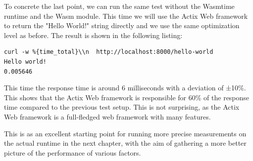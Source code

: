 To concrete the last point, we can run the same test without the Wasmtime runtime and the Wasm module. This time we will use the Actix Web framework to return the "Hello World!" string directly and we use the same optimization level as before. The result is shown in the following listing:

\begin{lstlisting}[frame=lines]
curl -w %{time_total}\\n  http://localhost:8000/hello-world
Hello world!
0.005646
\end{lstlisting}

This time the response time is around 6 milliseconds with a deviation of ±10\%. This shows that the Actix Web framework is responsible for 60\% of the response time compared to the previous test setup. This is not surprising, as the Actix Web framework is a full-fledged web framework with many features. 

This is as an excellent starting point for running more precise measurements on the actual runtime in the next chapter, with the aim of gathering a more better picture of the performance of various factors.
